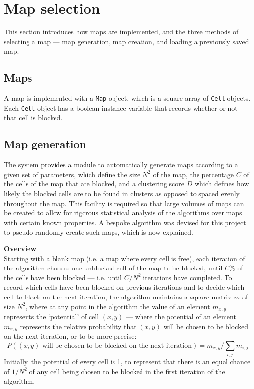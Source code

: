 \documentclass[12pt,notitlepage]{report}
\begin{document}
\section{Map selection}

This section introduces how maps are implemented, and the three methods of selecting a map --- map generation, map creation, and loading a previously saved map.\\

\subsection{Maps}
A map is implemented with a {\tt Map} object, which is a square array of {\tt Cell} objects. Each {\tt Cell} object has a boolean instance variable that records whether or not that cell is blocked.

\subsection{Map generation}
The system provides a module to automatically generate maps according to a given set of parameters, which define the size $N^{2}$ of the map, the percentage $C$ of the cells of the map that are blocked, and a clustering score $D$ which defines how likely the blocked cells are to be found in clusters as opposed to spaced evenly throughout the map. This facility is required so that large volumes of maps can be created to allow for rigorous statistical analysis of the algorithms over maps with certain known properties. A bespoke algorithm was devised for this project to pseudo-randomly create such maps, which is now explained.\\


\noindent
{\bfseries Overview}\\
\noindent
Starting with a blank map (i.e. a map where every cell is free), each iteration of the algorithm chooses one unblocked cell of the map to be blocked, until $C\%$ of the cells have been blocked --- i.e. until $C/N^{2}$ iterations have completed. To record which cells have been blocked on previous iterations and to decide which cell to block on the next iteration, the algorithm maintains a square matrix $m$ of size $N^{2}$, where at any point in the algorithm the value of an element $m_{x,y}$ represents the `potential' of cell $(x,y)$ --- where the potential of an element $m_{x,y}$ represents the relative probability that $(x,y)$ will be chosen to be blocked on the next iteration, or to be more precise: 
\begin{equation}
P((x,y) \mbox{ will be chosen to be blocked on the next iteration}) = m_{x,y}/\sum\limits_{i,j} m_{i,j}
\end{equation}
\noindent
Initially, the potential of every cell is 1, to represent that there is an equal chance of $1/N^{2}$ of any cell being chosen to be blocked in the first iteration of the algorithm.\\
\end{document}
